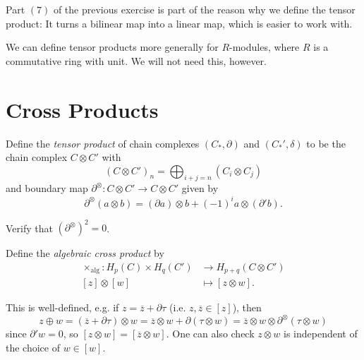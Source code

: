 \begin{remark}
  Part $(7)$ of the previous exercise is
  part of the reason why we define the tensor
  product: It turns a bilinear map into a linear
  map, which is easier to work with.
\end{remark}

\begin{remark}
  We can define tensor products more generally
  for $R$-modules, where $R$ is a
  commutative ring with unit. We will not
  need this, however.
\end{remark}

\section{Cross Products}
\begin{definition}
  Define the \emph{tensor product} of
  chain complexes $(C_*, \partial)$ and
  $(C_*', \delta)$ to be the chain complex
  $C \otimes C'$ with
  \[
    (C \otimes C')_n = \bigoplus_{i + j = n} (C_i \otimes C_j)
  \]
  and boundary map $\partial^\otimes : C \otimes C' \to C \otimes C'$
  given by
  \[
    \partial^\otimes(a \otimes b)
    = (\partial a) \otimes b + (-1)^i a \otimes (\partial' b).
  \]
\end{definition}

\begin{exercise}
  Verify that $(\partial^\otimes)^2 = 0$.
\end{exercise}

\begin{definition}
  Define the \emph{algebraic cross product} by
  \begin{align*}
    \times_{\mathrm{alg}} : H_p(C) \times H_q(C')
    &\longrightarrow H_{p + q}(C \otimes C') \\
    [z] \otimes [w] &\longmapsto [z \otimes w].
  \end{align*}
\end{definition}

\begin{remark}
  This is well-defined, e.g. if
  $z = \overline{z} + \partial \tau$ (i.e.
  $z, \overline{z} \in [z]$), then
  \[
    z \oplus w = (\overline{z} + \partial \tau) \otimes w
    = \overline{z} \otimes w + \partial(\tau \otimes w)
    = \overline{z} \otimes w \otimes \partial^\otimes(\tau \otimes w)
  \]
  since $\partial' w = 0$, so
  $[z \otimes w] = [\overline{z} \otimes w]$.
  One can also check $z \otimes w$ is
  independent of the choice of
  $w \in [w]$.
\end{remark}

